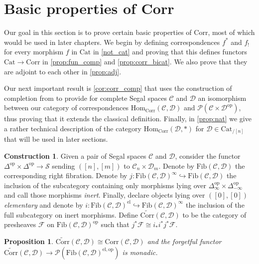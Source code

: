 \documentclass[a4paper, reqno]{amsart}
\newtheorem{prop}[theorem]{Proposition}
\theoremstyle{definition}
\newtheorem{construction}[theorem]{Construction}
\newcommand\cC{\mathscr C}
\newcommand\cD{\mathscr D}
\newcommand\cF{\mathscr F}
\newcommand\cP{\mathscr P}
\newcommand\cS{\mathscr S}
\newcommand\mor{\mathrm{Hom}}
\newcommand\op{\mathrm{op}}
\newcommand\cat{\mathrm{Cat}}
\newcommand\corr{\mathrm{Corr}}
\newcommand\fib{\mathrm{Fib}}
\newcommand\el{\mathrm{el}}
\begin{document}
\section{Basic properties of Corr}\label{sect:three}
Our goal in this section is to prove certain basic properties of $\corr$, most of which would be used in later chapters. We begin by defining correspondences $f^*$ and $f_!$ for every morphism $f$ in $\cat$ in \cref{not_cat} and proving that this defines functors $\cat\rightarrow\corr$ in \cref{prop:fun_comp} and \cref{prop:corr_bicat}. We also prove that they are adjoint to each other in \cref{prop:adj}.\par
Our next important result is \cref{cor:corr_comp} that uses the construction of completion from \cite{ayala2018flagged} to provide for complete Segal spaces $\cC$ and $\cD$ an isomorphism between our category of correspondences $\mor_\corr(\cC,\cD)$ and $\cP(\cC\times\cD^\op)$, thus proving that it extends the classical definition. Finally, in \cref{prop:nat} we give a rather technical description of the category $\mor_\corr(\cD,*)$ for $\cD\in\cat_{/[n]}$ that will be used in later sections.
\begin{construction}
Given a pair of Segal spaces $\cC$ and $\cD$, consider the functor $\Delta^\op\times\Delta^\op\rightarrow\cS$ sending $([n],[m])$ to $\cC_n\times\cD_m$. Denote by $\fib(\cC,\cD)$ the corresponding right fibration. Denote by $j:\fib(\cC,\cD)^\infty\hookrightarrow\fib(\cC,\cD)$ the inclusion of the subcategory containing only morphisms lying over $\Delta^\op_\infty\times\Delta^\op_{-\infty}$ and call those morphisms \textit{inert}. Finally, declare objects lying over $([0],[0])$ \textit{elementary} and denote by $i:\fib(\cC,\cD)^\el\hookrightarrow\fib(\cC,\cD)^\infty$ the inclusion of the full subcategory on inert morphisms. Define $\widetilde{\corr}(\cC,\cD)$ to be the category of presheaves $\cF$ on $\fib(\cC,\cD)^\op$ such that $j^*\cF\cong i_*i^*j^*\cF$.
\end{construction}
\begin{prop}\label{prop:corr_mor}
$\widetilde{\corr}(\cC,\cD)\cong\corr(\cC,\cD)$ and the forgetful functor $\widetilde{\corr}(\cC,\cD)\rightarrow\cP(\fib(\cC,\cD)^{\el,\op})$ is monadic.
\end{prop}
\end{document}
